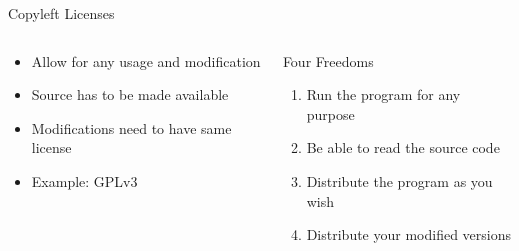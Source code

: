 \documentclass[compress,aspectratio=169]{beamer}
\begin{document}
  \begin{frame}{Copyleft Licenses}
    \begin{columns}
      \begin{column}{0.5\textwidth}
        \begin{itemize}
          \item Allow for any usage and modification
          \item Source has to be made available
          \item Modifications need to have same license
          \item Example: GPLv3
        \end{itemize}
      \end{column}
      \begin{column}{0.5\textwidth}
        \begin{block}{Four Freedoms \cite{freedoms}}
          \begin{enumerate}
            \item Run the program for any purpose
            \item Be able to read the source code
            \item Distribute the program as you wish
            \item Distribute your modified versions
          \end{enumerate}
        \end{block}
      \end{column}
    \end{columns}
  \end{frame}
\end{document}
